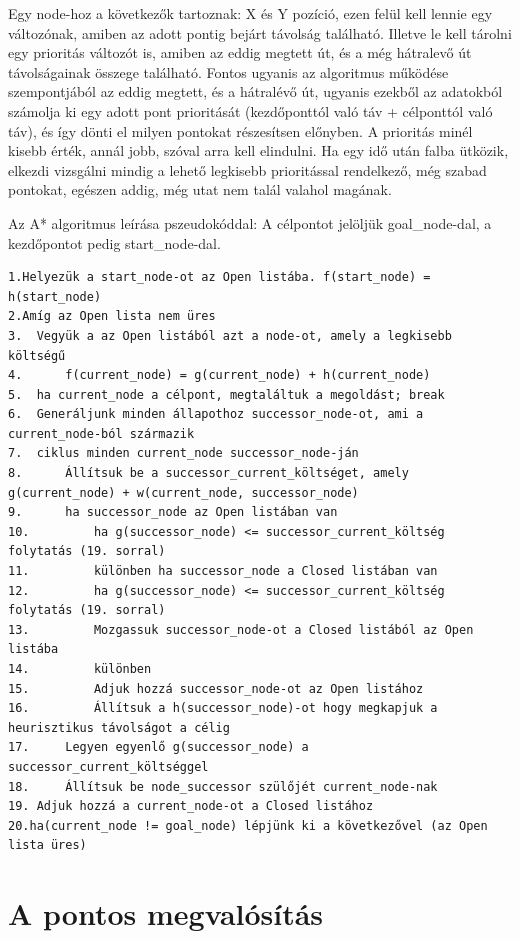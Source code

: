 Egy node-hoz a következők tartoznak: X és Y pozíció, ezen felül kell lennie egy változónak, amiben az adott pontig bejárt távolság található. Illetve le kell tárolni egy prioritás változót is, amiben az eddig megtett út, és a még hátralevő út távolságainak összege található.
Fontos ugyanis az algoritmus működése szempontjából az eddig megtett, és a hátralévő út, ugyanis ezekből az adatokból számolja ki egy adott pont prioritását (kezdőponttól való táv + célponttól való táv), és így dönti el milyen pontokat részesítsen előnyben. A prioritás minél kisebb érték, annál jobb, szóval arra kell elindulni. Ha egy idő után falba ütközik, elkezdi vizsgálni mindig a lehető legkisebb prioritással rendelkező, még szabad pontokat, egészen addig, még utat nem talál valahol magának.

Az A* algoritmus leírása pszeudokóddal:
A célpontot jelöljük goal\_node-dal, a kezdőpontot pedig start\_node-dal.

\begin{verbatim} 
1.Helyezük a start_node-ot az Open listába. f(start_node) = h(start_node)
2.Amíg az Open lista nem üres
3.	Vegyük a az Open listából azt a node-ot, amely a legkisebb költségű
4.		f(current_node) = g(current_node) + h(current_node)
5.	ha current_node a célpont, megtaláltuk a megoldást; break
6.	Generáljunk minden állapothoz successor_node-ot, ami a current_node-ból származik
7.	ciklus minden current_node successor_node-ján
8.		Állítsuk be a successor_current_költséget, amely g(current_node) + w(current_node, successor_node)
9.		ha successor_node az Open listában van
10.			ha g(successor_node) <= successor_current_költség folytatás (19. sorral)
11.			különben ha successor_node a Closed listában van
12.			ha g(successor_node) <= successor_current_költség folytatás (19. sorral)
13.			Mozgassuk successor_node-ot a Closed listából az Open listába
14.		    különben
15.			Adjuk hozzá successor_node-ot az Open listához
16.			Állítsuk a h(successor_node)-ot hogy megkapjuk a heurisztikus távolságot a célig
17.		Legyen egyenlő g(successor_node) a successor_current_költséggel
18.		Állítsuk be node_successor szülőjét current_node-nak
19.	Adjuk hozzá a current_node-ot a Closed listához
20.ha(current_node != goal_node) lépjünk ki a következővel (az Open lista üres)
\end{verbatim}

\section{A pontos megvalósítás}

